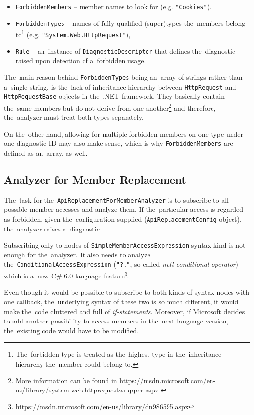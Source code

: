 \documentclass[
  digital, %
  table,   %
  lof,     %
  lot,     %
  oneside,
]{fithesis3}
\begin{document}
\begin{itemize}
  \item \texttt{ForbiddenMembers} -- member names to look for (e.g. \texttt{"Cookies"}).
  \item \texttt{ForbiddenTypes} -- names of fully qualified (super)types the~members belong to\footnote{The~forbidden type is treated as the~highest type in the~inheritance hierarchy the~member could belong to.
} (e.g. \texttt{"System.Web.HttpRequest"}), 
  \item \texttt{Rule} -- an~instance of \texttt{DiagnosticDescriptor} that defines the~diagnostic raised upon detection of a~forbidden usage.
\end{itemize} 

The~main reason behind \texttt{ForbiddenTypes} being an~array of strings rather than a~single string, is the~lack of inheritance hierarchy between \texttt{HttpRequest} and \texttt{HttpRequestBase} objects in the~.NET framework. They basically contain the~same members but do not derive from one another\footnote{More information can be found in \url{https://msdn.microsoft.com/en-us/library/system.web.httprequestwrapper.aspx}.} and therefore, the~analyzer must treat both types separately. 

On the~other hand, allowing for multiple forbidden members on one type under one diagnostic ID may also make sense, which is why \texttt{ForbiddenMembers} are defined as an~array, as well.

\subsection{Analyzer for Member Replacement}
The~task for the~\texttt{ApiReplacementForMemberAnalyzer} is to subscribe to all possible member accesses and analyze them. If the~particular access is regarded as forbidden, given the~configuration supplied (\texttt{ApiReplacementConfig} object), the~analyzer raises a~diagnostic.

Subscribing only to nodes of \texttt{SimpleMemberAccessExpression} syntax kind is not enough for the~analyzer. It also needs to analyze the~\texttt{ConditionalAccessExpression} (\texttt{"?."}, so-called \textit{null conditional operator}) which is a~new C\# 6.0 language feature\footnote{\url{https://msdn.microsoft.com/en-us/library/dn986595.aspx}}. 

Even though it would be possible to subscribe to both kinds of syntax nodes with one callback, the~underlying syntax of these two is so much different, it would make the~code cluttered and full of \textit{if-statements}. Moreover, if Microsoft decides to add another possibility to access members in the~next language version, the~existing code would have to be modified.
\end{document}
